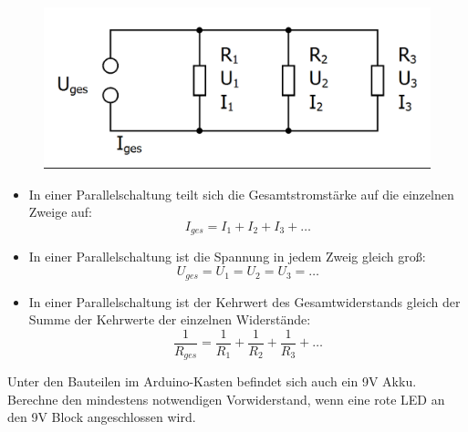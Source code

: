 \begin{tcolorbox}[equal height group=A,enhanced, colback=CadetBlue!70!green, coltext=black, colframe=DarkCyan!70!DarkGreen, width=0.48\textwidth, before=, after=\hfill, adjusted title={Elektrische Stromstärke und Spannung in der Parallelschaltung}, colbacktitle=CadetBlue!70!green, coltitle=black,fonttitle=\bfseries]
	\begin{figure}[H]
		\centering
		\includegraphics[width=\textwidth]{./Zeichnungen/parallelschaltung.png}
	\end{figure}
	\begin{itemize}[parsep=0ex,itemsep=0ex,leftmargin=*]
		\item In einer Parallelschaltung teilt sich die Gesamtstromstärke auf die einzelnen Zweige auf:
		\begin{equation*}
			I_{ges}=I_1+I_2+ I_3+\dots
		\end{equation*}
		\item In einer Parallelschaltung ist die Spannung in jedem Zweig gleich groß:
		\begin{equation*}
			U_{ges}=U_1=U_2=U_3=\dots
		\end{equation*}
		\item In einer Parallelschaltung ist der Kehrwert des Gesamtwiderstands gleich der Summe der Kehrwerte der einzelnen Widerstände:
		\begin{equation*}
			\frac{1}{R_{ges}} = \frac{1}{R_1} + \frac{1}{R_2} + \frac{1}{R_3} + \dots
		\end{equation*}
	\end{itemize}
\end{tcolorbox}

\begin{aufgabe}
	
	Unter den Bauteilen im Arduino-Kasten befindet sich auch ein 9V Akku. Berechne den mindestens notwendigen Vorwiderstand, wenn eine
	rote LED an den 9V Block angeschlossen wird.
\end{aufgabe}

